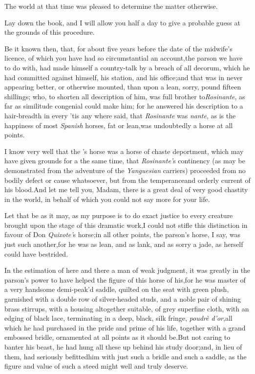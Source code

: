 \documentclass{article}
\begin{document}
The world at that time was pleased to determine the matter
otherwise.

Lay down the book, and I will allow you half a day to give a
probable guess at the grounds of this procedure.

Be it known then, that, for about five years before the date of
the midwife’s licence, of which you have had so
circumstantial an account,\tsk  the parson we have to do with, had
made himself a country-talk by a breach of all decorum, which he
had committed against himself, his station, and his
office;\tsk  and that was in never appearing better, or otherwise
mounted, than upon a lean, sorry,\break
{}
pound fifteen shillings; who, to shorten all description of
him, was full brother to\break \textit{Rosinante}, as far as similitude
congenial could make him; for he answered his\break
description to a hair-breadth in every\break
{}
’tis any where said, that \textit{Rosinante} was 
\textit{nante}, as is the happiness of most
\textit{Spanish} horses, fat or lean,\tsk  was undoubtedly a horse
at all points.

I know very well that the ’s\break
horse was a horse of chaste deportment, which may
have given grounds for a 
the same time, that \textit{Rosinante’}s continen\-cy (as may
be demonstrated from the adventure of the \textit{Yanguesian}
carriers) proceeded from no bodily defect or cause whatsoever, but
from the temperance\break and orderly current of his blood.\tsk  And\break
let me tell you, Madam, there is a great deal of very good chastity in the world, in
behalf of which you could not say more for your life.

Let that be as it may, as my purpose is to do exact justice to
every creature brought upon the stage of this dramatic
work,\tsk  I could not stifle this distinction in favour of Don
\textit{Quixote’}s horse;\tsh  in all other points, the
parson’s horse, I say, was just such another,\tsk for he was as
lean, and as lank, and as sorry a jade, as 
herself could have bestrided.

In the estimation of here and there a man of weak judgment, it was greatly
in the parson’s power to have helped the figure of
this horse of his,\tsk  for he was master of a very handsome
demi-peak’d saddle, quilted on the seat with green plush,
garnished with a double row of silver-headed studs, and a noble
pair of shining brass stirrups, with a housing altogether
suitable, of grey superfine cloth, with an edging of black lace,
terminating in a deep, black, silk fringe, \textit{poudrè
d’or},\tsk  all which he had purchased in the pride and prime of
his life, together with a grand embossed bridle, ornamented at
all points as it should be.\tsh  But not caring to banter his
beast, he had hung all these up behind his study door;\tsk and, in
lieu of them, had seriously befitted\break him with just such a bridle
and such a saddle, as the figure and value of such a steed might
well and truly deserve.
\end{document}
